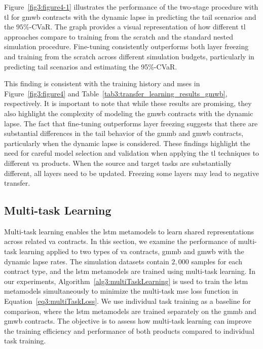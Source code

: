 Figure~\ref{fig3:figure4-1} illustrates the performance of the two-stage procedure with \gls{tl} for \gls{gmwb} contracts with the dynamic lapse in predicting the tail scenarios and the $95\%$-CVaR.
The graph provides a visual representation of how different \gls{tl} approaches compare to training from the scratch and the standard nested simulation procedure.
Fine-tuning consistently outperforms both layer freezing and training from the scratch across different simulation budgets, particularly in predicting tail scenarios and estimating the 95\%-CVaR. 

This finding is consistent with the training history and \gls{mse}s in Figure~\ref{fig3:figure4} and Table~\ref{tab3:transfer_learning_results_gmwb}, respectively.
It is important to note that while these results are promising, they also highlight the complexity of modeling the \gls{gmwb} contracts with the dynamic lapse. 
The fact that fine-tuning outperforms layer freezing suggests that there are substantial differences in the tail behavior of the \gls{gmmb} and \gls{gmwb} contracts, particularly when the dynamic lapse is considered. 
These findings highlight the need for careful model selection and validation when applying the \gls{tl} techniques to different \gls{va} products.
When the source and target tasks are substantially different, all layers need to be updated.
Freezing some layers may lead to negative transfer.


\subsection{Multi-task Learning}

Multi-task learning enables the \gls{lstm} metamodels to learn shared representations across related \gls{va} contracts.
In this section, we examine the performance of multi-task learning applied to two types of \gls{va} contracts, \gls{gmmb} and \gls{gmwb} with the dynamic lapse rates.
The simulation datasets contain $2,\!000$ samples for each contract type, and the \gls{lstm} metamodels are trained using multi-task learning. 
In our experiments, Algorithm~\ref{alg3:multiTaskLearning} is used to train the \gls{lstm} metamodels simultaneously to minimize the multi-task \gls{mse} loss function in Equation~\eqref{eq3:multiTaskLoss}.
We use individual task training as a baseline for comparison, where the \gls{lstm} metamodels are trained separately on the \gls{gmmb} and \gls{gmwb} contracts.
The objective is to assess how multi-task learning can improve the training efficiency and performance of both products compared to individual task training.

